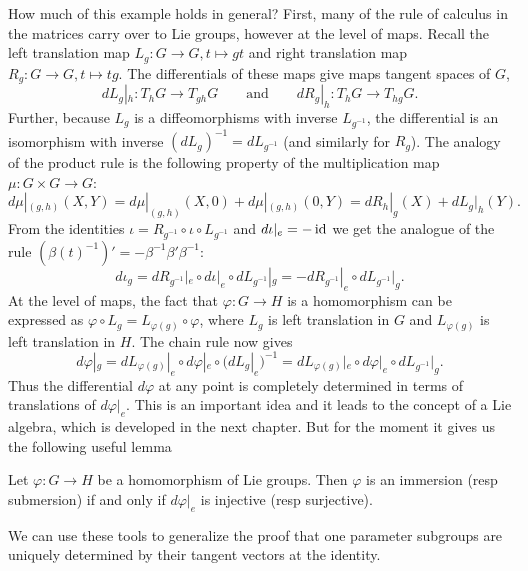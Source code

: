 How much of this example holds in general?
First, many of the rule of calculus in the matrices carry over to Lie groups, however at the level of maps.
Recall the left translation map $L_g : G \to G, t \mapsto gt$ and right translation map $R_g : G \to G, t \mapsto tg$.
The differentials of these maps give maps tangent spaces of $G$,
\[
dL_g|_h : T_hG \to T_{gh}G
\qquad\text{and}\qquad
dR_g|_h : T_hG \to T_{hg}G.
\]
Further, because $L_g$ is a diffeomorphisms with inverse $L_{g^{-1}}$, the differential is an isomorphism with inverse $(dL_g)^{-1} = dL_{g^{-1}}$ (and similarly for $R_g$).
The analogy of the product rule is the following property of the multiplication map $\mu : G \times G \to G$:
\[
d\mu|_{(g,h)}(X,Y)
= d\mu|_{(g,h)}(X,0) + d\mu|_{(g,h)}(0,Y)
= dR_h|_g(X) + dL_g|_h(Y).
\]
From the identities $\iota = R_{g^{-1}} \circ \iota \circ L_{g^{-1}}$ and $d\iota|_e = - \operatorname{id}$ we get the analogue of the rule $(\beta(t)^{-1})' = - \beta^{-1} \beta' \beta^{-1}$:
\[
d\iota_g 
= dR_{g^{-1}}|_e \circ d\iota|_e \circ dL_{g^{-1}}|_g 
= - dR_{g^{-1}}|_e \circ dL_{g^{-1}}|_g.
\]
At the level of maps, the fact that $\varphi : G \to H$ is a homomorphism can be expressed as $\varphi \circ L_g = L_{\varphi(g)} \circ \varphi$, where $L_g$ is left translation in $G$ and $L_{\varphi(g)}$ is left translation in $H$.
The chain rule now gives
\[
d\varphi|_g  
= dL_{\varphi(g)}|_e \circ d\varphi|_e \circ (dL_g|_e)^{-1}
= dL_{\varphi(g)}|_e \circ d\varphi|_e \circ dL_{g^{-1}}|_g.
\] 
Thus the differential $d\varphi$ at any point is completely determined  in terms of translations of $d\varphi|_e$.
This is an important idea and it leads to the concept of a Lie algebra, which is developed in the next chapter.
But for the moment it gives us the following useful lemma
\begin{lemma}
\label{lem:injective differential}
Let $\varphi : G \to H$ be a homomorphism of Lie groups.
Then $\varphi$ is an immersion (resp submersion) if and only if $d\varphi|_e$ is injective (resp surjective).
\end{lemma}

We can use these tools to generalize the proof that one parameter subgroups are uniquely determined by their tangent vectors at the identity.

